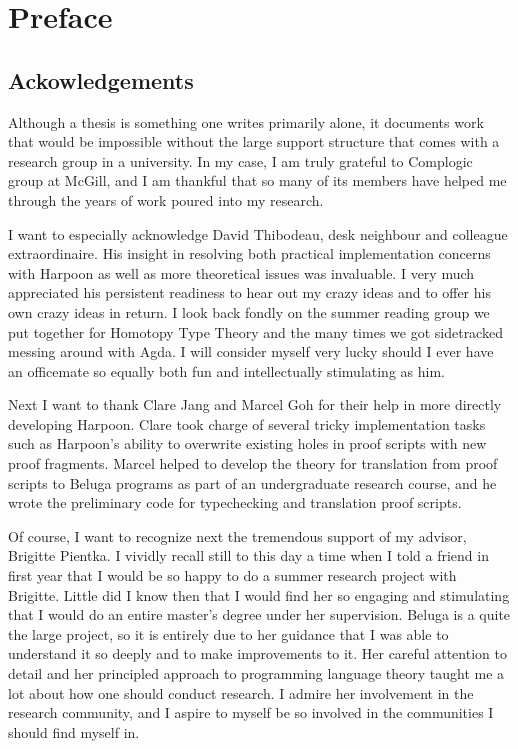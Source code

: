 \chapter*{Preface}

\section*{Ackowledgements}

Although a thesis is something one writes primarily alone, it documents work
that would be impossible without the large support structure that comes with a
research group in a university. In my case, I am truly grateful to Complogic
group at McGill, and I am thankful that so many of its members have helped me
through the years of work poured into my research.

I want to especially acknowledge David Thibodeau, desk neighbour and colleague
extraordinaire. His insight in resolving both practical implementation concerns
with Harpoon as well as more theoretical issues was invaluable.
I very much appreciated his persistent readiness to hear out my crazy ideas and
to offer his own crazy ideas in return.
I look back fondly on the summer reading group we put together for Homotopy Type
Theory and the many times we got sidetracked messing around with Agda.
I will consider myself very lucky should I ever have an officemate so equally
both fun and intellectually stimulating as him.

Next I want to thank Clare Jang and Marcel Goh for their help in more directly
developing Harpoon. Clare took charge of several tricky implementation tasks
such as Harpoon's ability to overwrite existing holes in proof scripts with new
proof fragments. Marcel helped to develop the theory for translation from proof
scripts to Beluga programs as part of an undergraduate research course, and he
wrote the preliminary code for typechecking and translation proof scripts.

Of course, I want to recognize next the tremendous support of my advisor,
Brigitte Pientka. I vividly recall still to this day a time when I told a friend
in first year that I would be so happy to do a summer research project with
Brigitte. Little did I know then that I would find her so engaging and
stimulating that I would do an entire master's degree under her supervision.
Beluga is a quite the large project, so it is entirely due to her guidance that
I was able to understand it so deeply and to make improvements to it.
Her careful attention to detail and her principled approach to programming
language theory taught me a lot about how one should conduct research.
I admire her involvement in the research community, and I aspire to myself be so
involved in the communities I should find myself in.


